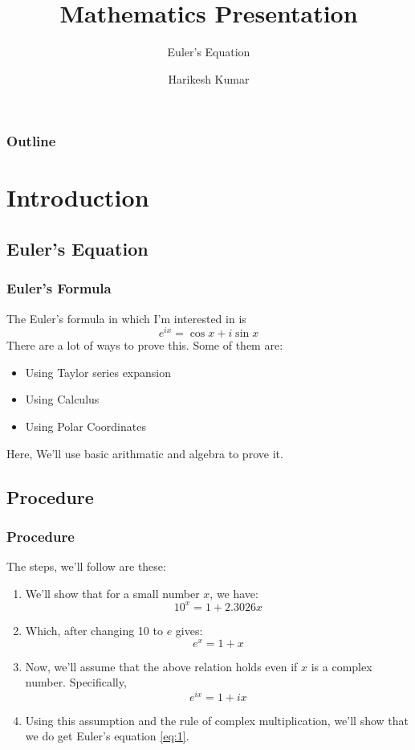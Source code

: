 \documentclass{beamer}
\title{Mathematics Presentation}
\subtitle{Euler's Equation}
\institute[IITD]{Indian Institute of Technology, Delhi}
\author{Harikesh Kumar}
\begin{document}
\maketitle
\begin{frame}
\frametitle{Outline}
\tableofcontents
\end{frame}
\label{Intro}
\section{Introduction}
\subsection{Euler's Equation}
\begin{frame}
\frametitle{Euler's Formula}
The Euler's formula in which I'm interested in is
\begin{equation}
    \label{eq:1}
        e^{ix} = \cos{x} + i\sin{x}
\end{equation}
There are a lot of ways to prove this. Some of them are:
\begin{itemize}
\color{blue}
\item <2-> Using Taylor series expansion
\item <3-> Using Calculus
\item <4-> Using Polar Coordinates
\end{itemize}
 Here, We'll use basic arithmatic and algebra to prove it.
\end{frame}
\subsection{Procedure}
\begin{frame}
    \frametitle{Procedure}
    The steps, we'll follow are these:
    \begin{enumerate}
        \item <2->  We'll show that for a small number $x$, we have: $$ 10^x = 1 + 2.3026x$$
        \item <3-> Which, after changing 10 to $e$ gives: $$ e^x = 1+x$$
        \item <4-> Now, we'll assume that the above relation holds even if $x$ is a complex number. Specifically, $$e^{ix} = 1+ix$$
        \item <5-> Using this assumption and the rule of complex multiplication, we'll show that we do get Euler's equation \ref{eq:1}.
    \end{enumerate}
\end{frame}
\end{document}
